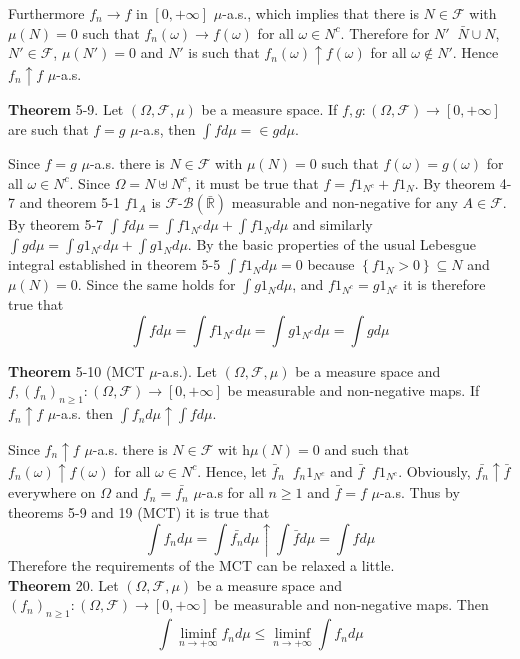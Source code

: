 \documentclass[a4paper]{article}
\newcommand{\obj}[1]{\left\{ #1 \right \}}
\newcommand{\clo}[1]{\left [ #1 \right ]}
\newcommand{\brac}[1]{\left ( #1 \right )}
\newcommand{\Rbar}{{\bar{\mathbb{R}}}}
\newcommand{\Zinf}{\clo{ 0, +\infty }}
\newcommand{\Fcal}{\mathcal{F}}
\newcommand{\borel}[1]{\mathcal{B}\brac{#1}}
\newcommand{\defn}{\mathop{\overset{\Delta}{=}}\nolimits}
\begin{document}
Furthermore $f_n\to f$ in $\Zinf$ $\mu$-a.s., which implies that there is $N\in\Fcal$ with $\mu\brac{N}=0$ such that $f_n\brac{\omega}\to f\brac{\omega}$ for all $\omega\in N^c$. Therefore for $N'\defn \bar{N}\cup N$, $N'\in \Fcal$, $\mu\brac{N'}=0$ and $N'$ is such that $f_n\brac{\omega}\uparrow f\brac{\omega}$ for all $\omega\notin N'$. Hence $f_n\uparrow f$ $\mu$-a.s.

\label{thm:usu_int_muas} \noindent \textbf{Theorem} 5-9.
Let $\brac{\Omega, \Fcal, \mu}$ be a measure space. If $f,g:\brac{\Omega,\Fcal}\to\Zinf$ are such that $f=g$ $\mu$-a.s, then $\int f d\mu = \in g d\mu$.

Since $f=g$ $\mu$-a.s. there is $N\in \Fcal$ with $\mu\brac{N}=0$ such that $f\brac{\omega}=g\brac{\omega}$ for all $\omega\in N^c$. Since $\Omega=N \uplus N^c$, it must be true that $f = f 1_{N^c}+ f 1_N$. By theorem 4-7 and theorem 5-1 $f 1_A$ is $\Fcal$-$\borel{\Rbar}$ measurable and non-negative for any $A\in \Fcal$. By theorem 5-7 $\int f d\mu = \int f 1_{N^c} d\mu + \int f 1_N d\mu$ and similarly $\int g d\mu = \int g 1_{N^c} d\mu + \int g 1_N d\mu$. By the basic properties of the usual Lebesgue integral established in theorem 5-5 $\int f 1_N d\mu=0$ because $\obj{f 1_N>0} \subseteq N$ and $\mu\brac{N}=0$. Since the same holds for $\int g 1_N d\mu$, and $f 1_{N^c} = g 1_{N^c}$ it is therefore true that \[\int f d\mu = \int f 1_{N^c} d\mu = \int g 1_{N^c} d\mu = \int g d\mu\]

\label{thm:muas_mct} \noindent \textbf{Theorem} 5-10 (MCT $\mu$-a.s.).
Let $\brac{\Omega, \Fcal, \mu}$ be a measure space and $f,\brac{f_n}_{n\geq 1}:\brac{\Omega, \Fcal}\to\Zinf$ be measurable and non-negative maps. If $f_n \uparrow f$ $\mu$-a.s. then $\int f_n d\mu \uparrow \int f d\mu$.

Since $f_n\uparrow f$ $\mu$-a.s. there is $N\in \Fcal$ wit h$\mu\brac{N}=0$ and such that $f_n\brac{\omega}\uparrow f\brac{\omega}$ for all $\omega\in N^c$. Hence, let $\bar{f}_n\defn f_n 1_{N^c}$ and $\bar{f}\defn f 1_{N^c}$. Obviously, $\bar{f_n}\uparrow \bar{f}$ everywhere on $\Omega$ and $f_n=\bar{f_n}$ $\mu$-a.s for all $n\geq1$ and $\bar{f}=f$ $\mu$-a.s. Thus by theorems 5-9 and 19 (MCT) it is true that \[\int f_n d\mu=\int \bar{f_n} d\mu\uparrow \int \bar{f} d\mu=\int f d\mu\] Therefore the requirements of the MCT can be relaxed a little.\\

\label{thm:fatou} \noindent \textbf{Theorem} 20.
Let $\brac{\Omega, \Fcal, \mu}$ be a measure space and $\brac{f_n}_{n\geq 1}:\brac{\Omega, \Fcal}\to\Zinf$ be measurable and non-negative maps. Then \[\int \liminf_{n\to+\infty} f_n d\mu \leq \liminf_{n\to+\infty} \int f_n d\mu\]
\end{document}
